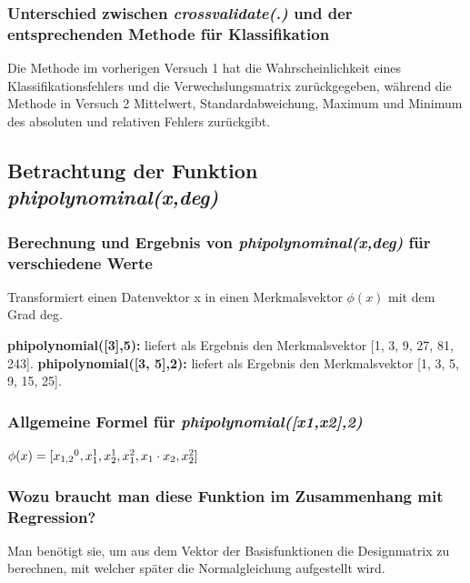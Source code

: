 \subsubsection{ Unterschied  zwischen \textit{crossvalidate(.)} und der entsprechenden Methode für Klassifikation}

\noindent
Die Methode im vorherigen Versuch 1 hat die Wahrscheinlichkeit eines Klassifikationsfehlers und die Verwechslungsmatrix zurückgegeben, während die Methode in Versuch 2 Mittelwert, Standardabweichung, Maximum und Minimum des absoluten und relativen Fehlers zurückgibt. 

\subsection{
    Betrachtung der Funktion \textit{phi\textunderscore polynominal(x,deg)}
}

\subsubsection{ Berechnung und Ergebnis von \textit{phi\textunderscore polynominal(x,deg)} für verschiedene Werte}

Transformiert einen Datenvektor x in einen Merkmalsvektor $\phi (x)$ mit dem Grad deg. 

\noindent
\textbf{phi\textunderscore polynomial([3],5):} liefert als Ergebnis den Merkmalsvektor [1, 3, 9, 27, 81, 243].
\noindent
\textbf{phi\textunderscore polynomial([3, 5],2):} liefert als Ergebnis den Merkmalsvektor [1, 3, 5, 9, 15, 25].

\subsubsection{ Allgemeine Formel für \textit{phi\textunderscore polynomial([x1,x2],2)} }

\begin{center}
    $\phi (x) = [x\textsubscript{1,2}^0, x_1^1, x_2^1, x_1^2, x_1\cdot x_2, x_2^2]$
\end{center}

\subsubsection{ Wozu braucht man diese Funktion im Zusammenhang mit Regression? }

\noindent
Man benötigt sie, um aus dem Vektor der Basisfunktionen die Designmatrix zu berechnen, mit welcher später die Normalgleichung aufgestellt wird. 

